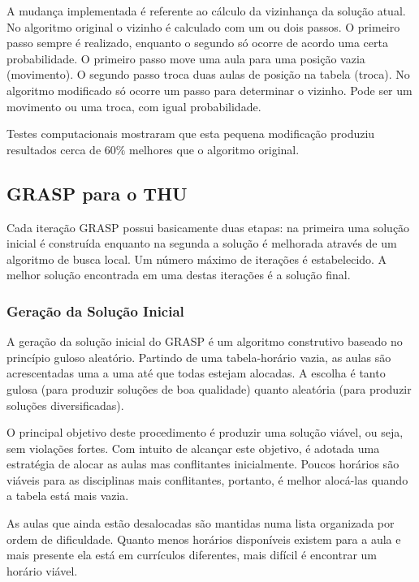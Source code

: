 \documentclass[11pt]{article}
\begin{document}
A mudança implementada é referente ao cálculo da vizinhança da solução atual. No algoritmo original o vizinho é calculado com um ou dois passos. O primeiro passo sempre é realizado, enquanto o segundo só ocorre de acordo uma certa probabilidade. O primeiro passo move uma aula para uma posição vazia (movimento). O segundo passo troca duas aulas de posição na tabela (troca). No algoritmo modificado só ocorre um passo para determinar o vizinho. Pode ser um movimento ou uma troca, com igual probabilidade.

Testes computacionais mostraram que esta pequena modificação produziu resultados cerca de $60\%$ melhores que o algoritmo original.

\subsection{GRASP para o THU}

Cada iteração GRASP \cite{grasp_resende_ribeiro} possui basicamente duas etapas: na primeira uma solução inicial é construída enquanto na segunda a solução é melhorada através de um algoritmo de busca local. Um número máximo de iterações é estabelecido. A melhor solução encontrada em uma destas iterações é a solução final.

\subsubsection{Geração da Solução Inicial}

A geração da solução inicial do GRASP é um algoritmo construtivo baseado no princípio guloso aleatório. Partindo de uma tabela-horário vazia, as aulas são acrescentadas uma a uma até que todas estejam alocadas. A escolha é tanto gulosa (para produzir soluções de boa qualidade) quanto aleatória (para produzir soluções diversificadas).

O principal objetivo deste procedimento é produzir uma solução viável, ou seja, sem violações fortes. Com intuito de alcançar este objetivo, é adotada uma estratégia de alocar as aulas mas conflitantes inicialmente. Poucos horários são viáveis para as disciplinas mais conflitantes, portanto, é melhor alocá-las quando a tabela está mais vazia.

As aulas que ainda estão desalocadas são mantidas numa lista organizada por ordem de dificuldade. Quanto menos horários disponíveis existem para a aula e mais presente ela está em currículos diferentes, mais difícil é encontrar um horário viável.
\end{document}

